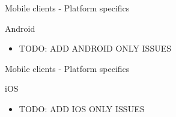 \documentclass[11pt]{beamer}
\begin{document}
\begin{frame}{Mobile clients - Platform specifics}

  Android

  \begin{itemize}

    \item TODO: ADD ANDROID ONLY ISSUES

  \end{itemize}

\end{frame}


\begin{frame}{Mobile clients - Platform specifics}

  iOS

  \begin{itemize}

    \item TODO: ADD IOS ONLY ISSUES

  \end{itemize}

\end{frame}
\end{document}
